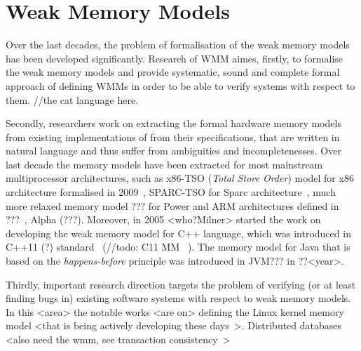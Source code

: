 \chapter{Weak Memory Models}
\label{ch:wmm}

Over the last decades, the problem of formalisation of the weak memory models
has been developed significantly. Research of WMM aimes, firstly, to formalise the weak memory models and provide systematic, sound and complete formal approach of defining WMMs in order to be able to verify systems with respect to them. 
//the cat language here.

Secondly, researchers work on extracting the formal hardware memory models from existing implementations of from their specifications, that are written in natural language and thus suffer from ambiguities and incompletenesses. Over last decade the memory models have been extracted for most mainstream multiprocessor architectures, such as x86-TSO (\textit{Total Store Order}) model for x86 architecture formalised in 2009~\cite{owens2009better}, SPARC-TSO for Sparc architecture~\cite{?!?!?!}, much more relaxed memory model ??? for Power and ARM architectures defined in ???~\cite{sarkar2011understanding}, Alpha (???). Moreover, in 2005 <who?Milner> started the work on developing the weak memory model for C++ language, which was introduced in C++11 (?) standard~\cite{???} (//todo: C11 MM ~\cite{batty2011mathematizing}). The memory model for Java that is based on the \textit{happens-before} principle was introduced in JVM??? in ??<year>. 

Thirdly, important research direction targets the problem of verifying (or at least finding bugs in) existing software systems with respect to weak memory models. In this <area> the notable works <are on> defining the Linux kernel memory model <that is being actively developing these days~\cite{kernel_wmm_1}>. Distributed databases <also need the wmm, see transaction consistency~\cite{bailis2013highly}>


